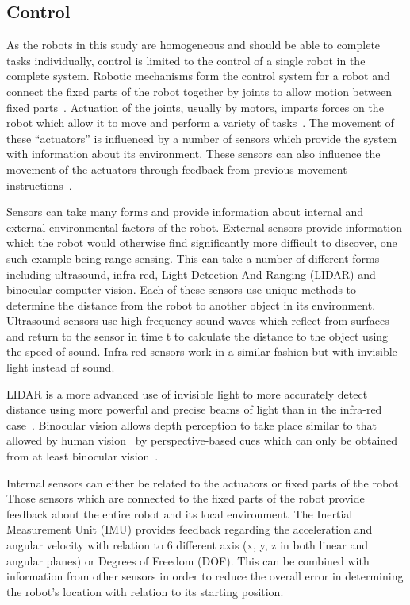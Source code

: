 \subsection{Control}\label{litreview/robotics/control}  
As the robots in this study are homogeneous and should be able to complete tasks individually, control is limited to the control of a single robot in the complete system. Robotic mechanisms form the control system for a robot and connect the fixed parts of the robot together by joints to allow motion between fixed parts~\cite{lynch2017modern}.
Actuation of the joints, usually by motors, imparts forces on the robot which allow it to move and perform a variety of tasks~\cite{lynch2017modern}.
The movement of these ``actuators'' is influenced by a number of sensors which provide the system with information about its environment. These sensors can also influence the movement of the actuators through feedback from previous movement instructions~\cite{lynch2017modern}.    

Sensors can take many forms and provide information about internal and external environmental factors of the robot. External sensors provide information which the robot would otherwise find significantly more difficult to discover, one such example being range sensing. This can take a number of different forms including ultrasound, infra-red, Light Detection And Ranging (LIDAR) and binocular computer vision. Each of these sensors use unique methods to determine the distance from the robot to another object in its environment. Ultrasound sensors use high frequency sound waves which reflect from surfaces and return to the sensor in time t to calculate the distance to the object using the speed of sound. Infra-red sensors work in a similar fashion but with invisible light instead of sound. 

LIDAR is a more advanced use of invisible light to more accurately detect distance using more powerful and precise beams of light than in the infra-red case~\cite{LIDAR}. Binocular vision allows depth perception to take place similar to that allowed by human vision~\cite{read2005early} by perspective-based cues which can only be obtained from at least binocular vision~\cite{
pfautz2002depth}. 

Internal sensors can either be related to the actuators or fixed parts of the robot. Those sensors which are connected to the fixed parts of the robot provide feedback about the entire robot and its local environment. The Inertial Measurement Unit (IMU) provides feedback regarding the acceleration and angular velocity with relation to 6 different axis (x, y, z in both linear and angular planes) or Degrees of Freedom (DOF). This can be combined with information from other sensors in order to reduce the overall error in determining the robot's location with relation to its starting position.  

